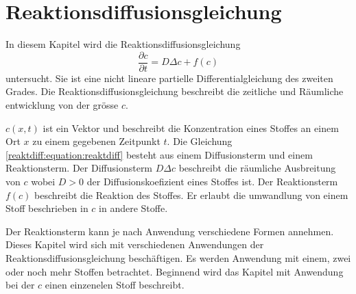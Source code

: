 %
%
%
%
\chapter{Reaktionsdiffusionsgleichung\label{chapter:reaktdiff}}
\begin{refsection}

In diesem Kapitel wird die Reaktionsdiffusionsgleichung
\begin{equation}
\label{reaktdiff:equation:reaktdiff}
\frac{\partial c}{\partial t} = D \Delta c + f(c)
\end{equation}
untersucht.
Sie ist eine nicht lineare partielle Differentialgleichung des zweiten Grades.
Die Reaktionsdiffusionsgleichung beschreibt die zeitliche und Räumliche entwicklung von der grösse \(c\).

\(c(x,t)\) ist ein Vektor und beschreibt die Konzentration eines Stoffes an einem Ort \(x\) zu einem gegebenen Zeitpunkt \(t\).
Die Gleichung \ref{reaktdiff:equation:reaktdiff} besteht aus einem Diffusionsterm und einem Reaktionsterm.
Der Diffusionsterm \(D \Delta c\) beschreibt die räumliche Ausbreitung von \(c\) wobei \(D > 0\) der Diffusionskoefizient eines Stoffes ist.
Der Reaktionsterm \(f(c)\) beschreibt die Reaktion des Stoffes.
Er erlaubt die umwandlung von einem Stoff beschrieben in \(c\) in andere Stoffe.

Der Reaktionsterm kann je nach Anwendung verschiedene Formen annehmen.
Dieses Kapitel wird sich mit verschiedenen Anwendungen der Reaktionsdiffusionsgleichung beschäftigen.
Es werden Anwendung mit einem, zwei oder noch mehr Stoffen betrachtet.
Beginnend wird das Kapitel mit Anwendung bei der \(c\) einen einzenelen Stoff beschreibt.


% 

% 

\printbibliography[heading=subbibliography]
\end{refsection}

